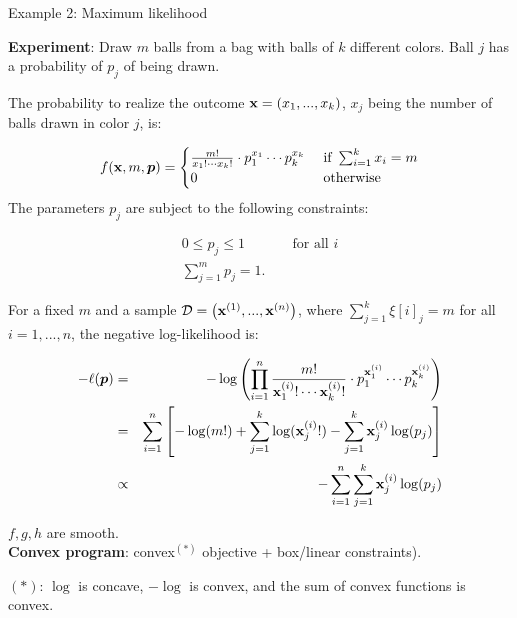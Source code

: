 \documentclass[11pt,compress,t,notes=noshow, xcolor=table]{beamer}
\begin{document}
\begin{vbframe}{Example 2: Maximum likelihood}

\textbf{Experiment}: Draw $m$ balls from a bag with balls of $k$ different colors. Ball $j$ has a probability of $p_j$ of being drawn. 

\lz 

The probability to realize the outcome $\xv = (x_1, ..., x_k)$, $x_j$ being the number of balls drawn in color $j$, is: 

$$
	f(\xv, m, \bm{p}) = \begin{cases} \frac{m!}{x_1! \cdots x_k!} \cdot p_1^{x_1} \cdots p_k^{x_k} & \text{ if } \sum_{i = 1}^k x_i = m \\ 0 & \text{ otherwise}\end{cases}
$$
The parameters $p_j$ are subject to the following constraints: 

\begin{eqnarray*}
	0 \le p_j \le 1 && \text{ for all } i \\
	 \sum_{j = 1}^m p_j = 1. &&
\end{eqnarray*}

\framebreak 

For a fixed $m$ and a sample $\D = \left(\xi[1], ..., \xi[n]\right)$, where $\sum_{j = 1}^k \xi[i]_j = m$ for all $i = 1, ..., n$, the negative log-likelihood is: 


\begin{eqnarray*}
	- \ell(\bm{p}) &=& - \log \left(\prod_{i = 1}^n  \frac{m!}{\xi_1! \cdots \xi_k!} \cdot p_1^{\xi_1} \cdots p_k^{\xi_k}    \right) \\
	&=& \sumin \left[- \log(m!) + \sum_{j = 1}^k \log(\xi_j!) - \sum_{j = 1}^k \xi_j \log(p_j)\right] \\
	&\propto& - \sumin \sum_{j = 1}^k \xi_j \log(p_j) 
\end{eqnarray*}

$f, g, h$ are smooth.\\\textbf{Convex program}: convex$^{(*)}$ objective + box/linear constraints). 

\vfill
\begin{footnotesize}
${(*)}$: $\log$ is concave, $- \log $ is convex, and the sum of convex functions is convex. 
\end{footnotesize}

\end{vbframe}




	
\end{document}
